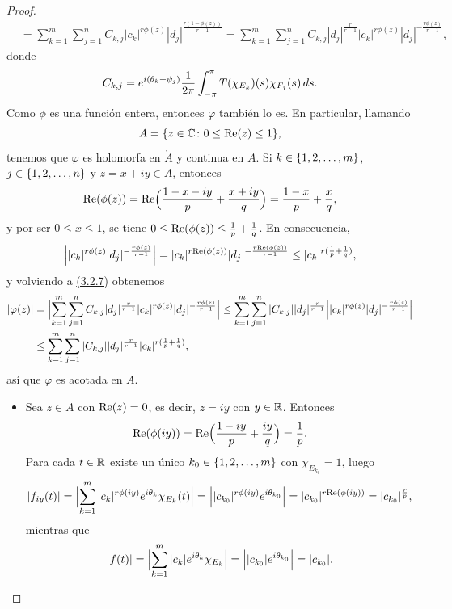 \documentclass[a4paper, 12pt, oneside]{book}
\begin{document}
\begin{proof}
\begin{align}
        &= \sum_{k=1}^m \sum_{j=1}^n C_{k,j} |c_k|^{r\phi(z)} |d_j|^{\frac{r(1-\phi(z))}{r-1}} = \sum_{k=1}^m \sum_{j=1}^n C_{k,j}|d_j|^{\frac{r}{r-1}} |c_k|^{r\phi(z)} |d_j|^{-\frac{r\phi(z)}{r-1}},
    \end{align}
    donde
    \[C_{k,j} = e^{i(\theta_k+\psi_j)}\frac{1}{2\pi}\integral[s]{-\pi}{\pi}{T(\chi_{E_k})(s)\chi_{F_j}(s)}.\]
    Como $\phi$ es una función entera, entonces $\varphi$ también lo es. En particular, llamando
    \[A = \{z \in \C \colon 0 \leq \real(z) \leq 1\},\]
    tenemos que $\varphi$ es holomorfa en $\mathring{A}$ y continua en $A$. Si $k\in \{1,2,\mathellipsis,m\}$, $j \in \{1,2,\mathellipsis,n\}$ y  $z =x+iy\in A$, entonces
    \[\real(\phi(z)) = \real\Bigl(\frac{1-x-iy}{p}+\frac{x+iy}{q}\Bigr) = \frac{1-x}{p}+\frac{x}{q},\]
    y por ser $0 \leq x \leq 1$, se tiene $0 \leq \real(\phi(z)) \leq \frac{1}{p}+\frac{1}{q}$. En consecuencia,
    \begin{align*}
        \Bigl||c_k|^{r\phi(z)} |d_j|^{-\frac{r\phi(z)}{r-1}}\Bigr| = |c_k|^{r\real(\phi(z))}|d_j|^{-\frac{r\real(\phi(z))}{r-1}} \leq |c_k|^{r(\frac{1}{p}+\frac{1}{q})},
    \end{align*} 
    y volviendo a \hyperref[3.2.7]{\color{blue}(3.2.7)} obtenemos
    \begin{align*}
        |\varphi(z)| &= \Bigl|\sum_{k=1}^m \sum_{j=1}^n C_{k,j}|d_j|^{\frac{r}{r-1}} |c_k|^{r\phi(z)} |d_j|^{-\frac{r\phi(z)}{r-1}}\Bigr| \leq\sum_{k=1}^m \sum_{j=1}^n |C_{k,j}||d_j|^{\frac{r}{r-1}} \Bigl||c_k|^{r\phi(z)} |d_j|^{-\frac{r\phi(z)}{r-1}}\Bigr| \\
        &\leq\sum_{k=1}^m \sum_{j=1}^n |C_{k,j}||d_j|^{\frac{r}{r-1}} |c_k|^{r(\frac{1}{p}+\frac{1}{q})},
    \end{align*}
    así que $\varphi$ es acotada en $A$.
    \begin{itemize}
        \item Sea $z \in A$ con $\real(z) = 0$, es decir, $z = iy$ con $y \in \R$. Entonces
        \[\real(\phi(iy)) = \real\Bigl(\frac{1-iy}{p}+\frac{iy}{q}\Bigr) = \frac{1}{p}.\]
        Para cada $t \in \R$ existe un único $k_0 \in \{1,2,\mathellipsis,m\}$ con $\chi_{E_{k_0}} =1$, luego
        \begin{align*}
            |f_{iy}(t)| = \Bigl|\sum_{k=1}^m |c_k|^{r\phi(iy)}e^{i\theta_k}\chi_{E_k}(t)\Bigr| = \Bigl||c_{k_0}|^{r\phi(iy)}e^{i\theta_{k_0}}\Bigr| = |c_{k_0}|^{r\real(\phi(iy))} = |c_{k_0}|^{\frac{r}{p}},
        \end{align*} 
        mientras que
        \[|f(t)| =  \Bigl|\sum_{k=1}^m |c_k|e^{i\theta_k}\chi_{E_k}\Bigr| = \Bigl||c_{k_0}|e^{i\theta_{k_0}}\Bigr| = |c_{k_0}|.\]

\end{itemize}
\end{proof}
\end{document}
